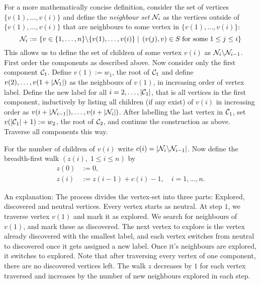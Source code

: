 For a more mathematically concise definition,
consider the set of vertices $\{ v(1),\dots, v(i) \}$
and define the \emph{neighbour set} $\mathcal{N}_{i}$ as the vertices outside of
$\{ v(1),\dots, v(i) \}$ 
that are neighbours to some vertex in 
$\{ v(1),\dots, v(i) \}$:
\begin{equation}
\mathcal{N}_{i} := 
\left\lbrace v \in \{1, \dots, n\} \backslash \{ v(1),\dots, v(i) \} 
\; | \; 
\left(v(j), v\right) \in S \; \text{for some} \; 1 \leq j \leq i \right\rbrace
\end{equation}
This allows us to define the set of children of some vertex $v(i)$ as
$\mathcal{N}_{i} \backslash \mathcal{N}_{i-1}$.
First order the components as described above. 
Now consider only the first component $\mathcal{C}_{1}$.
Define $v(1) := w_1$, the root of $\mathcal{C}_{1}$ and define
$v(2), \dots , v(1 + |\mathcal{N}_{1}|)$ 
as the neighbours of $v(1)$,
in increasing order of vertex label. 
Define the new label for all 
$i = 2, \dots, |\mathcal{C}_{1}|$,
that is all vertices in the first component,
inductively by listing all children (if any exist) of $v(i)$
in increasing order as 
$ v(i + |\mathcal{N}_{i-1}|), \dots, v(i + |\mathcal{N}_{i}|) $.
After labelling the last vertex in $\mathcal{C}_{1}$, set
$v(|\mathcal{C}_{1}| + 1) := w_2$, 
the root of $\mathcal{C}_{2}$, and continue the construction as above.
Traverse all components this way.


For the number of children of $v(i)$ write 
$c(i) = |\mathcal{N}_{i} \backslash\mathcal{N}_{i-1}|$.
Now define the breadth-first walk 
$(z(i), \; 1 \leq i \leq n)$
by
\begin{equation} \label{E: def bf-walk z}
\begin{aligned}
z(0) &:= 0, \\
z(i) &:= z(i-1) + c(i) -1, \quad i=1, \dots , n.
\end{aligned}
\end{equation}


An explanation:
The process divides the vertex-set into three parts: 
Explored, discovered and neutral vertices. Every vertex starts as neutral.
At step $1$, we traverse vertex $v(1)$ and mark it as explored.
We search for neighbours of $v(1)$, and mark these as discovered.
The next vertex to explore is the vertex already discovered with the smallest label,
and each vertex switches from neutral to discovered once it gets assigned a new label.
Once it's neighbours are explored, it switches to explored.
Note that after traversing every vertex of one component, 
there are no discovered vertices left.
The walk $z$ decreases by $1$ for each vertex traversed
and increases by the number of new neighbours explored in each step.


